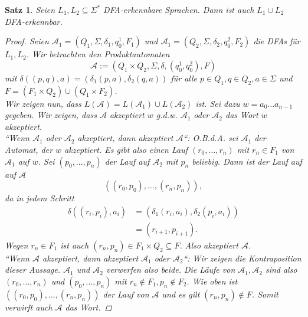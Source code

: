 \documentclass[11pt, a4paper]{article}
\theoremstyle{definition}
\theoremstyle{plain}
\newtheorem{theorem}[definition]{Satz}
\numberwithin{equation}{section}
\begin{document}
\begin{theorem}\label{thm:regular_union}
	Seien \( L_1, L_2 \subseteq \Sigma^\ast \) DFA-erkennbare Sprachen. Dann ist auch \( L_1 \cup L_2 \) DFA-erkennbar.
	\begin{proof}
		Seien \( \mathcal{A}_1 = (Q_1, \Sigma, \delta_1, q_0^1, F_1) \) und \( \mathcal{A}_1 = (Q_2, \Sigma, \delta_2, q_0^2, F_2) \) die DFAs für \( L_1, L_2 \). Wir betrachten den \textit{Produktautomaten}
		\[
			\mathcal{A} := (Q_1 \times Q_2, \Sigma, \delta, (q_0^1, q_0^2), F)
		\]
		mit \( \delta((p, q), a) = (\delta_1(p, a), \delta_2(q, a)) \) für alle \( p \in Q_1, q \in Q_2, a \in \Sigma \) und \( F = (F_1 \times Q_2) \cup (Q_1 \times F_2) \).\\
		Wir zeigen nun, dass \( L(\mathcal{A}) = L(\mathcal{A}_1) \cup L(\mathcal{A}_2) \) ist.
		Sei dazu \( w = a_0 \ldots a_{n-1} \) gegeben. Wir zeigen, dass \( \mathcal{A} \) akzeptiert \( w \) {g.d.w.} \( \mathcal{A}_1 \) oder \( \mathcal{A}_2 \) das Wort \( w \) akzeptiert.\\
		``Wenn \( \mathcal{A}_1 \) oder \( \mathcal{A}_2 \) akzeptiert, dann akzeptiert \( \mathcal{A} \)``:
		{O.B.d.A.} sei \( \mathcal{A}_1 \) der Automat, der \( w \) akzeptiert. Es gibt also einen Lauf \( (r_0, \ldots, r_n) \) mit \( r_n \in F_1 \) von \( \mathcal{A}_1 \) auf \( w \). Sei \( (p_0, \ldots, p_n) \) der Lauf auf \( \mathcal{A}_2 \) mit \( p_n \) beliebig. Dann ist der Lauf auf auf \( \mathcal{A} \)
		\[
			((r_0, p_0), \ldots, (r_n, p_n)),
		\]
		da in jedem Schritt 
		\begin{align*}
			\delta((r_i, p_i), a_i) &= (\delta_1(r_i, a_i), \delta_2(p_i, a_i)) \\
			&= (r_{i+1}, p_{i+1}).
		\end{align*}
		Wegen \( r_n \in F_1 \) ist auch \( (r_n, p_n) \in F_1 \times Q_2 \subseteq F \). Also akzeptiert \( \mathcal{A} \).\\
		``Wenn \( \mathcal{A} \) akzeptiert, dann akzeptiert \( \mathcal{A}_1 \) oder \( \mathcal{A}_2 \)``:
		Wir zeigen die Kontraposition dieser Aussage. \( \mathcal{A}_1 \) und \( \mathcal{A}_2 \) verwerfen also beide. Die Läufe von \( \mathcal{A}_1, \mathcal{A}_2 \) sind also \( (r_0, \ldots, r_n) \) und \( (p_0, \ldots, p_n) \) mit \( r_n \notin F_1, p_n \notin F_2 \). Wie oben ist \( ((r_0, p_0), \ldots, (r_n, p_n)) \) der Lauf von \( \mathcal{A} \) und es gilt \( (r_n, p_n) \notin F \). Somit verwirft auch \( \mathcal{A} \) das Wort.
	\end{proof}
\end{theorem}
\end{document}
